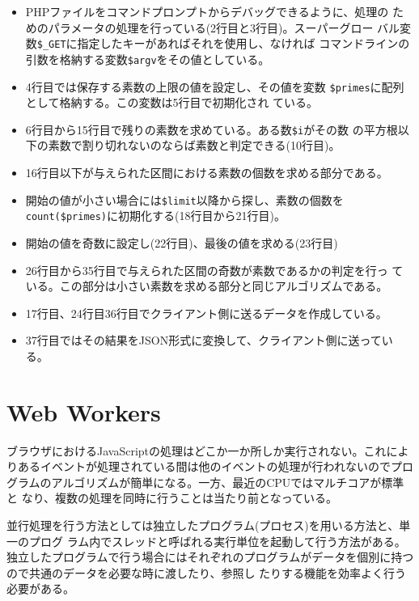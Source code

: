 \begin{Exec}
 \begin{itemize}
  \item PHPファイルをコマンドプロンプトからデバッグできるように、処理の
        ためのパラメータの処理を行っている(2行目と3行目)。スーパーグロー
        バル変数\Verb+$_GET+に指定したキーがあればそれを使用し、なければ
        コマンドラインの引数を格納する変数\Verb+$argv+をその値としている。
  \item 4行目では保存する素数の上限の値を設定し、その値を変数
        \Verb+$primes+に配列として格納する。この変数は5行目で初期化され
        ている。
  \item 6行目から15行目で残りの素数を求めている。ある数\Verb+$i+がその数
        の平方根以下の素数で割り切れないのならば素数と判定できる(10行目)。
  \item 16行目以下が与えられた区間における素数の個数を求める部分である。
  \item 開始の値が小さい場合には\Verb+$limit+以降から探し、素数の個数を
        \Verb+count($primes)+に初期化する(18行目から21行目)。
  \item 開始の値を奇数に設定し(22行目)、最後の値を求める(23行目)
  \item 26行目から35行目で与えられた区間の奇数が素数であるかの判定を行っ
        ている。この部分は小さい素数を求める部分と同じアルゴリズムである。
  \item 17行目、24行目36行目でクライアント側に送るデータを作成している。
  \item 37行目ではその結果をJSON形式に変換して、クライアント側に送ってい
        る。
 \end{itemize}
\end{Exec}
\section{Web Workers}
\iffalse
ブラウザにおけるJavaScriptの処理はどこか一か所しか実行されない。これによ
りあるイベントが処理されている間は他のイベントの処理が行われないのでプロ
グラムのアルゴリズムが簡単になる。一方、最近のCPUではマルチコアが標準と
なり、複数の処理を同時に行うことは当たり前となっている。

並行処理を行う方法としては独立したプログラム(プロセス)を用いる方法と、単一のプログ
ラム内でスレッドと呼ばれる実行単位を起動して行う方法がある。
独立したプログラムで行う場合にはそれぞれのプログラムがデータを個別に持つ
ので共通のデータを必要な時に渡したり、参照し
たりする機能を効率よく行う必要がある。

